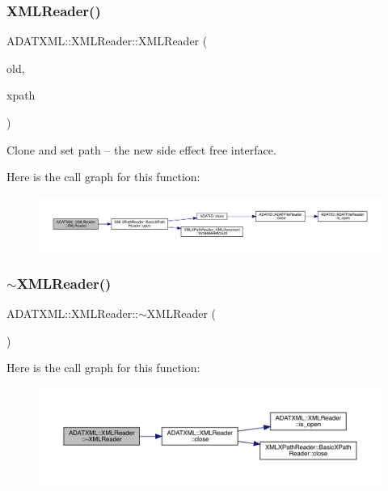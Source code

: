 \subsubsection{\texorpdfstring{XMLReader()}{XMLReader()}\hspace{0.1cm}{\footnotesize\ttfamily [15/15]}}
{\footnotesize\ttfamily A\+D\+A\+T\+X\+M\+L\+::\+X\+M\+L\+Reader\+::\+X\+M\+L\+Reader (\begin{DoxyParamCaption}\item[{\mbox{\hyperlink{classADATXML_1_1XMLReader}{X\+M\+L\+Reader}} \&}]{old,  }\item[{const std\+::string \&}]{xpath }\end{DoxyParamCaption})\hspace{0.3cm}{\ttfamily [inline]}}



Clone and set path -- the new side effect free interface. 

Here is the call graph for this function\+:
\nopagebreak
\begin{figure}[H]
\begin{center}
\leavevmode
\includegraphics[width=350pt]{db/d3f/classADATXML_1_1XMLReader_aef69d83a0f47db461436fc2fd3bb7723_cgraph}
\end{center}
\end{figure}
\mbox{\label{classADATXML_1_1XMLReader_a98c4936a3366f39443113290b7bd164a}} 
\subsubsection{\texorpdfstring{$\sim$XMLReader()}{~XMLReader()}\hspace{0.1cm}{\footnotesize\ttfamily [3/3]}}
{\footnotesize\ttfamily A\+D\+A\+T\+X\+M\+L\+::\+X\+M\+L\+Reader\+::$\sim$\+X\+M\+L\+Reader (\begin{DoxyParamCaption}{ }\end{DoxyParamCaption})\hspace{0.3cm}{\ttfamily [inline]}}

Here is the call graph for this function\+:
\nopagebreak
\begin{figure}[H]
\begin{center}
\leavevmode
\includegraphics[width=350pt]{db/d3f/classADATXML_1_1XMLReader_a98c4936a3366f39443113290b7bd164a_cgraph}
\end{center}
\end{figure}



